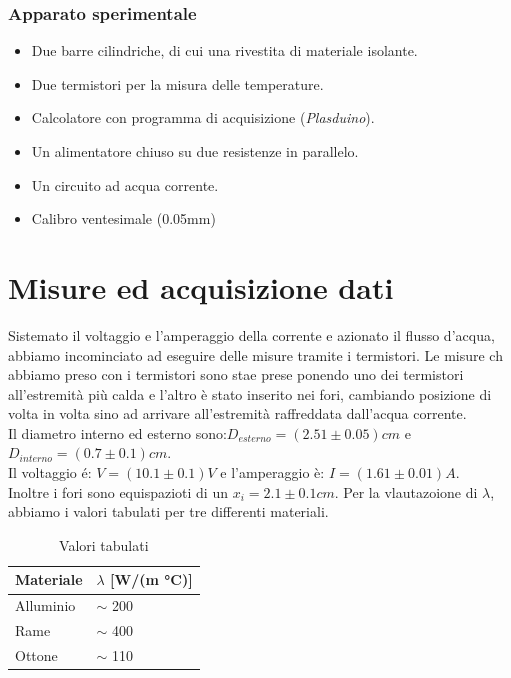 \documentclass[a4paper,10pt]{article}
\begin{document}
\subsubsection{Apparato sperimentale}
\begin{itemize}
 \item Due barre cilindriche, di cui una rivestita di materiale isolante.
 \item Due termistori per la misura delle temperature.
 \item Calcolatore con programma di acquisizione (\textit{Plasduino}).
 \item Un alimentatore chiuso su due resistenze in parallelo.
 \item Un circuito ad acqua corrente.
 \item Calibro ventesimale (0.05mm)
\end{itemize}
\section{Misure ed acquisizione dati}
Sistemato il voltaggio e l'amperaggio della corrente e azionato il flusso d'acqua, abbiamo incominciato ad eseguire delle misure tramite i termistori. Le misure ch abbiamo preso con i
termistori sono stae prese ponendo uno dei termistori all'estremità più calda e l'altro è stato inserito nei fori, cambiando posizione di volta in volta sino ad arrivare all'estremità
raffreddata dall'acqua corrente.\\
Il diametro interno ed esterno sono:$D_{esterno}=(2.51\pm0.05)cm$ e $D_{interno}=(0.7\pm0.1)cm$.\\
Il voltaggio é: $V=(10.1\pm0.1)V$ e l'amperaggio è: $I=(1.61\pm0.01)A$.\\
Inoltre i fori sono equispazioti di un $x_i=2.1\pm0.1cm$.
Per la vlautazoione di $\lambda$, abbiamo i valori tabulati per tre differenti materiali.
\begin{table}[H]
\centering
\caption{Valori tabulati}
\label{my-label}
\begin{tabular}{|l|l|l|}
\hline
Materiale & \multicolumn{2}{l|}{$\lambda$ {[}W/(m °C){]}} \\ \hline
Alluminio & \multicolumn{2}{l|}{$\sim$ 200}               \\ \hline
Rame      & \multicolumn{2}{l|}{$\sim$ 400}               \\ \hline
Ottone    & \multicolumn{2}{l|}{$\sim$ 110}               \\ \hline
\end{tabular}
\end{table}
\end{document}
